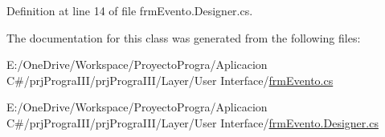 Definition at line 14 of file frm\+Evento.\+Designer.\+cs.



The documentation for this class was generated from the following files\+:\begin{DoxyCompactItemize}
\item 
E\+:/\+One\+Drive/\+Workspace/\+Proyecto\+Progra/\+Aplicacion C\#/prj\+Progra\+I\+I\+I/prj\+Progra\+I\+I\+I/\+Layer/\+User Interface/\hyperlink{frm_evento_8cs}{frm\+Evento.\+cs}\item 
E\+:/\+One\+Drive/\+Workspace/\+Proyecto\+Progra/\+Aplicacion C\#/prj\+Progra\+I\+I\+I/prj\+Progra\+I\+I\+I/\+Layer/\+User Interface/\hyperlink{frm_evento_8_designer_8cs}{frm\+Evento.\+Designer.\+cs}\end{DoxyCompactItemize}
